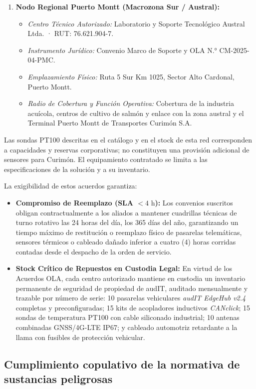 \begin{enumerate}
  \item \textbf{Nodo Regional Puerto Montt (Macrozona Sur / Austral):}
  \begin{itemize}
    \item \textit{Centro Técnico Autorizado:} Laboratorio y Soporte Tecnológico Austral Ltda. · RUT: 76.621.904-7.
    \item \textit{Instrumento Jurídico:} Convenio Marco de Soporte y OLA N.° CM-2025-04-PMC.
    \item \textit{Emplazamiento Físico:} Ruta 5 Sur Km 1025, Sector Alto Cardonal, Puerto Montt.
    \item \textit{Radio de Cobertura y Función Operativa:} Cobertura de la industria acuícola, centros de cultivo de salmón y enlace con la zona austral y el Terminal Puerto Montt de Transportes Curimón S.A.
  \end{itemize}
\end{enumerate}

Las sondas PT100 descritas en el catálogo y en el stock de esta red corresponden a capacidades y reservas corporativas; no constituyen una provisión adicional de sensores para Curimón. El equipamiento contratado se limita a las especificaciones de la solución y a su inventario.

La exigibilidad de estos acuerdos garantiza:
\begin{itemize}
  \item \textbf{Compromiso de Reemplazo (SLA $< 4\text{ h}$):} Los convenios suscritos obligan contractualmente a los aliados a mantener cuadrillas técnicas de turno rotativo las 24 horas del día, los 365 días del año, garantizando un tiempo máximo de restitución o reemplazo físico de pasarelas telemáticas, sensores térmicos o cableado dañado inferior a cuatro (4) horas corridas contadas desde el despacho de la orden de servicio.
  \item \textbf{Stock Crítico de Repuestos en Custodia Legal:} En virtud de los Acuerdos OLA, cada centro autorizado mantiene en custodia un inventario permanente de seguridad de propiedad de audIT, auditado mensualmente y trazable por número de serie: 10 pasarelas vehiculares \textit{audIT EdgeHub v2.4} completas y preconfiguradas; 15 kits de acopladores inductivos \textit{CANclick}; 15 sondas de temperatura PT100 con cable siliconado industrial; 10 antenas combinadas GNSS/4G-LTE IP67; y cableado automotriz retardante a la llama con fusibles de protección vehicular.
\end{itemize}

\subsection{Cumplimiento copulativo de la normativa de sustancias peligrosas}\label{sec:1-suspel}

